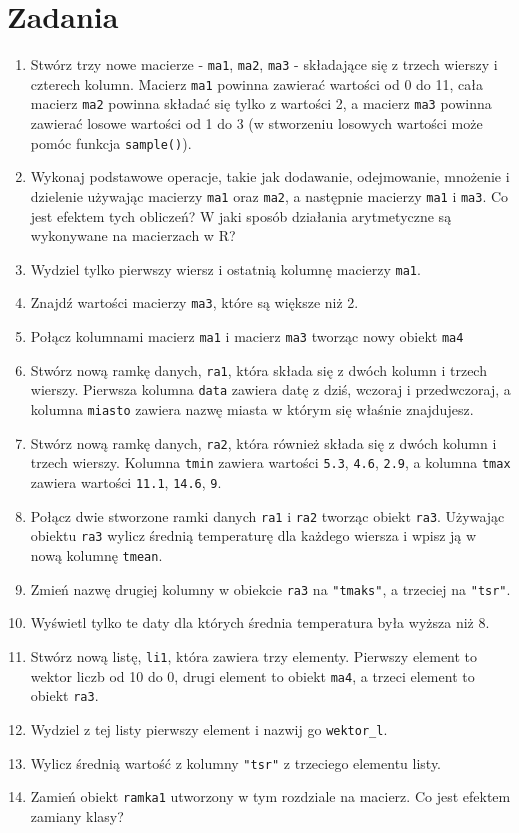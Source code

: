\documentclass[paper=6in:9in,pagesize=pdftex,headinclude=on,footinclude=on,10pt]{scrbook}
\providecommand{\tightlist}{%
  \setlength{\itemsep}{0pt}\setlength{\parskip}{0pt}}
\begin{document}
\hypertarget{zadania-6}{%
\section{Zadania}\label{zadania-6}}

\begin{enumerate}
\def\labelenumi{\arabic{enumi})}
\tightlist
\item
  Stwórz trzy nowe macierze - \texttt{ma1}, \texttt{ma2}, \texttt{ma3} - składające się z trzech wierszy i czterech kolumn.
  Macierz \texttt{ma1} powinna zawierać wartości od 0 do 11, cała macierz \texttt{ma2} powinna składać się tylko z wartości 2, a macierz \texttt{ma3} powinna zawierać losowe wartości od 1 do 3 (w stworzeniu losowych wartości może pomóc funkcja \texttt{sample()}).
\item
  Wykonaj podstawowe operacje, takie jak dodawanie, odejmowanie, mnożenie i dzielenie używając macierzy \texttt{ma1} oraz \texttt{ma2}, a następnie macierzy \texttt{ma1} i \texttt{ma3}.
  Co jest efektem tych obliczeń?
  W jaki sposób działania arytmetyczne są wykonywane na macierzach w R?
\item
  Wydziel tylko pierwszy wiersz i ostatnią kolumnę macierzy \texttt{ma1}.
\item
  Znajdź wartości macierzy \texttt{ma3}, które są większe niż 2.
\item
  Połącz kolumnami macierz \texttt{ma1} i macierz \texttt{ma3} tworząc nowy obiekt \texttt{ma4}
\item
  Stwórz nową ramkę danych, \texttt{ra1}, która składa się z dwóch kolumn i trzech wierszy.
  Pierwsza kolumna \texttt{data} zawiera datę z dziś, wczoraj i przedwczoraj, a kolumna \texttt{miasto} zawiera nazwę miasta w którym się właśnie znajdujesz.
\item
  Stwórz nową ramkę danych, \texttt{ra2}, która również składa się z dwóch kolumn i trzech wierszy.
  Kolumna \texttt{tmin} zawiera wartości \texttt{5.3}, \texttt{4.6}, \texttt{2.9}, a kolumna \texttt{tmax} zawiera wartości \texttt{11.1}, \texttt{14.6}, \texttt{9}.
\item
  Połącz dwie stworzone ramki danych \texttt{ra1} i \texttt{ra2} tworząc obiekt \texttt{ra3}.
  Używając obiektu \texttt{ra3} wylicz średnią temperaturę dla każdego wiersza i wpisz ją w nową kolumnę \texttt{tmean}.
\item
  Zmień nazwę drugiej kolumny w obiekcie \texttt{ra3} na \texttt{"tmaks"}, a trzeciej na \texttt{"tsr"}.
\item
  Wyświetl tylko te daty dla których średnia temperatura była wyższa niż 8.
\item
  Stwórz nową listę, \texttt{li1}, która zawiera trzy elementy.
  Pierwszy element to wektor liczb od 10 do 0, drugi element to obiekt \texttt{ma4}, a trzeci element to obiekt \texttt{ra3}.
\item
  Wydziel z tej listy pierwszy element i nazwij go \texttt{wektor\_l}.
\item
  Wylicz średnią wartość z kolumny \texttt{"tsr"} z trzeciego elementu listy.
\item
  Zamień obiekt \texttt{ramka1} utworzony w tym rozdziale na macierz.
  Co jest efektem zamiany klasy?
\end{enumerate}
\end{document}
